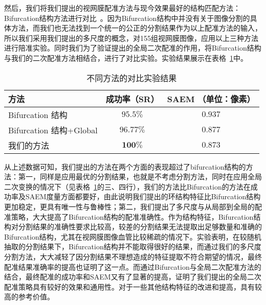 然后，我们将我们提出的视网膜配准方法与现今效果最好的结构匹配方法：Bifurcation结构方法进行对比~\cite{chen}。因为Bifurcation结构中并没有关于图像分割的具体方法，而我们也无法找到一个统一的公正的分割结果作为以上配准方法的输入，所以我们采用我们提出的多尺度的概念，对155组视网膜图像，应用以上三种方法进行陪准实验。同时我们为了验证提出的全局二次配准的作用，将Bifurcation结构与我们的二次配准方法相结合，进行了对比实验。实验结果展示在表格~\ref{methods2}中。
\begin{table}[!ht]
\caption{不同方法的对比实验结果}
\centering
\begin{tabular}{lcc}
\toprule
方法 & 成功率（SR）& SAEM （单位：像素）\\
\midrule
Bifurcation 结构& $95.5\%$ & $0.937$ \\
Bifurcation 结构+Global & $96.77\%$ & $0.877$ \\
我们的方法& $\mathbf{100\%}$ & $\mathbf{0.873}$\\
\bottomrule
\end{tabular}
\label{methods2}
\end{table}

从上述数据可知，我们提出的方法在两个方面的表现超过了bifurcation结构的方法：第一，同样是应用最优的分割结果，也就是不考虑分割方法，同时在应用全局二次变换的情况下（见表格~\ref{methods2}的三、四行），我们的方法比Bifurcation的方法在成功率及SAEM度量方面都要好，由此说明我们提出的环结构特征比Bifurcation结构更加稳定，更具有唯一性与鲁棒性；第二，我们提出了多尺度与从局部到全局的配准策略，大大提高了Bifurcation结构的配准准确性。作为结构特征，Bifurcation结构对分割结果的准确性要求比较高，较差的分割结果无法提取出足够数量和准确的Bifurcation结构，尤其在视网膜图像血管比较稀疏的情况下。实验表明，在较随机抽取的分割结果下，Bifurcation结构并不能取得很好的结果，而通过我们的多尺度分割方法，大大减轻了因分割结果不理想造成的特征提取不符合期望的情况，最终配准结果准确率的提高也证明了这一点。而通过Bifurcation与全局二次配准方法的结合，最终配准的成功率和SAEM又有了显著的提高，证明了我们提出的全局二次配准策略具有较好的效果和通用性。对于一些其他结构特征的改进和提高，具有较高的参考价值。

